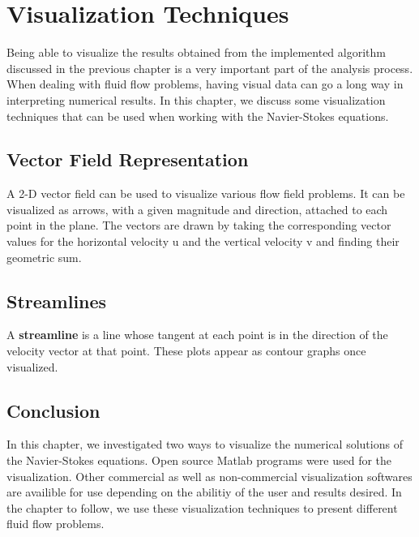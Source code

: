 
%

\chapter{Visualization Techniques}

Being able to visualize the results obtained from the implemented algorithm discussed in the previous chapter is a very important part of the analysis process. When dealing with fluid flow problems, having visual data can go a long way in interpreting numerical results. In this chapter, we discuss some visualization techniques that can be used when working with the Navier-Stokes equations.

\section{Vector Field Representation}

A 2-D vector field can be used to visualize various flow field problems. It can be visualized as arrows, with a given magnitude and direction, attached to each point in the plane. The vectors are drawn by taking the corresponding vector values for the horizontal velocity u and the vertical velocity v and finding their geometric sum.
\section{Streamlines}

\begin{defi}
A \textbf{streamline} is a line whose tangent at each point is in the direction of the velocity vector at that point. These plots appear as contour graphs once visualized. 
\end{defi}

\section{Conclusion}
In this chapter, we investigated two ways to visualize the numerical solutions of the Navier-Stokes equations. Open source Matlab programs were used for the visualization. Other commercial as well as non-commercial visualization softwares are availible for use depending on the abilitiy of the user and results desired. In the chapter to follow, we use these visualization techniques to present different fluid flow problems.
%